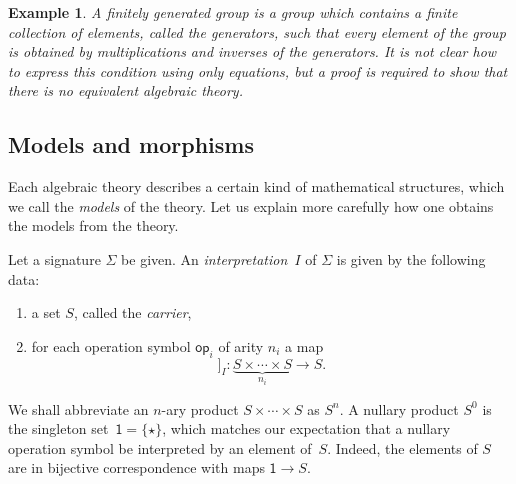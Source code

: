 \documentclass{amsart}
\newcommand{\op}{\mathsf{op}}
\newcommand{\one}{\mathsf{1}}
\newcommand{\sem}[1]{[\![#1]\!]}
\newtheorem{example}[definition]{Example}
\begin{document}
\begin{example}
  \label{ex:finitely-generated-group}
  A \emph{finitely generated group} is a group which contains a finite collection of
  elements, called the \emph{generators}, such that every element of the group is obtained
  by multiplications and inverses of the generators. It is not clear how to express this
  condition using only equations, but a proof is required to show that there is no
  equivalent algebraic theory.
\end{example}


\subsection{Models and morphisms}
\label{sec:models-and-morphisms}

Each algebraic theory describes a certain kind of mathematical structures, which we call
the \emph{models} of the theory. Let us explain more carefully how one obtains the models
from the theory.

Let a signature $\Sigma$ be given. An \emph{interpretation~$I$} of $\Sigma$ is given by
the following data:
% 
\begin{enumerate}
\item a set $S$, called the \emph{carrier},
\item for each operation symbol $\op_i$ of arity $n_i$ a map
  \begin{equation*}
    \sem{\op_i}_I : \underbrace{S \times \cdots \times S}_{n_i} \to S.
  \end{equation*}
\end{enumerate}
%
We shall abbreviate an $n$-ary product $S \times \cdots \times S$ as $S^n$. A nullary
product $S^0$ is the singleton set~$\one = \{\star\}$, which matches our expectation that
a nullary operation symbol be interpreted by an element of~$S$. Indeed, the elements of
$S$ are in bijective correspondence with maps $\one \to S$.
\end{document}
